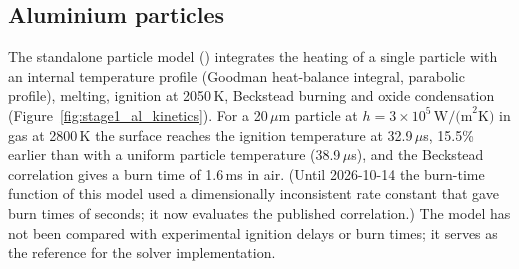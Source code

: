 \documentclass{article}
\begin{document}
\subsection{Aluminium particles}
\label{sec:res_al}

The standalone particle model () integrates the heating of a single particle with an internal temperature profile (Goodman heat-balance integral, parabolic profile), melting, ignition at 2050\,K, Beckstead burning and oxide condensation (Figure~\ref{fig:stage1_al_kinetics}). For a 20\,$\mu$m particle at $h = 3\times10^5\,\text{W/(m}^2\text{K)}$ in gas at 2800\,K the surface reaches the ignition temperature at 32.9\,$\mu$s, 15.5\% earlier than with a uniform particle temperature (38.9\,$\mu$s), and the Beckstead correlation gives a burn time of 1.6\,ms in air. (Until 2026-10-14 the burn-time function of this model used a dimensionally inconsistent rate constant that gave burn times of seconds; it now evaluates the published correlation.) The model has not been compared with experimental ignition delays or burn times; it serves as the reference for the solver implementation.
\end{document}
